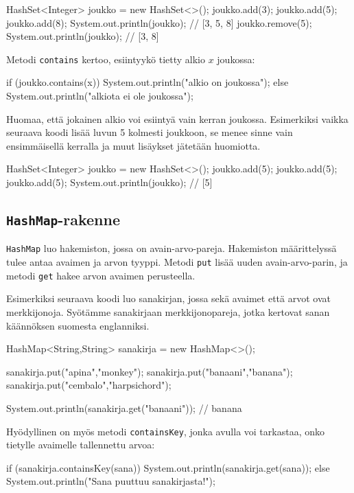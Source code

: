 \begin{code}
HashSet<Integer> joukko = new HashSet<>();
joukko.add(3);
joukko.add(5);
joukko.add(8);
System.out.println(joukko); // [3, 5, 8]
joukko.remove(5);
System.out.println(joukko); // [3, 8]
\end{code}

Metodi \texttt{contains} kertoo, esiintyykö tietty alkio $x$ joukossa:

\begin{code}
if (joukko.contains(x)) {
    System.out.println("alkio on joukossa");
} else {
    System.out.println("alkiota ei ole joukossa");
}
\end{code}

Huomaa, että jokainen alkio voi esiintyä vain kerran joukossa.
Esimerkiksi vaikka seuraava koodi lisää luvun 5 kolmesti
joukkoon, se menee sinne vain ensimmäisellä kerralla ja
muut lisäykset jätetään huomiotta.

\begin{code}
HashSet<Integer> joukko = new HashSet<>();
joukko.add(5);
joukko.add(5);
joukko.add(5);
System.out.println(joukko); // [5]
\end{code}

\subsection{\texttt{HashMap}-rakenne}

\texttt{HashMap} luo hakemiston,
jossa on avain-arvo-pareja.
Hakemiston määrit\-telyssä tulee antaa
avaimen ja arvon tyyppi.
Metodi \texttt{put} lisää uuden avain-arvo-parin,
ja metodi \texttt{get} hakee arvon avaimen perusteella.

Esimerkiksi seuraava koodi luo sanakirjan, jossa sekä
avaimet että arvot ovat merkkijonoja.
Syötämme sanakirjaan merkkijonopareja, jotka kertovat
sanan käännöksen suomesta englanniksi.

\begin{code}
HashMap<String,String> sanakirja = new HashMap<>();

sanakirja.put("apina","monkey");
sanakirja.put("banaani","banana");
sanakirja.put("cembalo","harpsichord");

System.out.println(sanakirja.get("banaani")); // banana
\end{code}

Hyödyllinen on myös metodi \texttt{containsKey},
jonka avulla voi tarkastaa, onko tietylle avaimelle
tallennettu arvoa:

\begin{code}
if (sanakirja.containsKey(sana)) {
    System.out.println(sanakirja.get(sana));
} else {
    System.out.println("Sana puuttuu sanakirjasta!");
}
\end{code}

